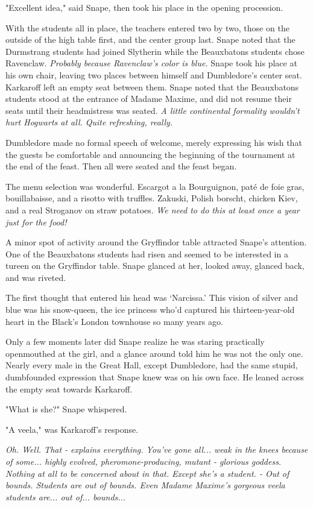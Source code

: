 "Excellent idea," said Snape, then took his place in the opening procession.

With the students all in place, the teachers entered two by two, those on the outside of the high table first, and the center group last. Snape noted that the Durmstrang students had joined Slytherin while the Beauxbatons students chose Ravenclaw. \emph{Probably because Ravenclaw's color is blue.} Snape took his place at his own chair, leaving two places between himself and Dumbledore's center seat. Karkaroff left an empty seat between them. Snape noted that the Beauxbatons students stood at the entrance of Madame Maxime, and did not resume their seats until their headmistress was seated. \emph{A little continental formality wouldn't hurt Hogwarts at all. Quite refreshing, really.}

Dumbledore made no formal speech of welcome, merely expressing his wish that the guests be comfortable and announcing the beginning of the tournament at the end of the feast. Then all were seated and the feast began.

The menu selection was wonderful. Escargot a la Bourguignon, paté de foie gras, bouillabaisse, and a risotto with truffles. Zakuski, Polish borscht, chicken Kiev, and a real Stroganov on straw potatoes. \emph{We need to do this at least once a year just for the food!}

A minor spot of activity around the Gryffindor table attracted Snape's attention. One of the Beauxbatons students had risen and seemed to be interested in a tureen on the Gryffindor table. Snape glanced at her, looked away, glanced back, and was riveted.

The first thought that entered his head was `Narcissa.' This vision of silver and blue was his snow-queen, the ice princess who'd captured his thirteen-year-old heart in the Black's London townhouse so many years ago.

Only a few moments later did Snape realize he was staring practically openmouthed at the girl, and a glance around told him he was not the only one. Nearly every male in the Great Hall, except Dumbledore, had the same stupid, dumbfounded expression that Snape knew was on his own face. He leaned across the empty seat towards Karkaroff.

"What is she?" Snape whispered.

"A veela," was Karkaroff's response.

\emph{Oh. Well. That - explains everything. You've gone all... weak in the knees because of some... highly evolved, pheromone-producing, mutant - glorious goddess. Nothing at all to be concerned about in that. Except she's a student. - Out of bounds. Students are out of bounds. Even Madame Maxime's gorgeous veela students are... out of... bounds...}

